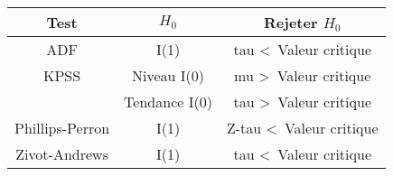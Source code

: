  \begin{f}{\ }

\begin{center}
	\begin{tabular}{ c | c | c }
		Test            & \(H_{0}\)    & Rejeter \(H_{0}\)                     \\ \hline
		ADF             & I(1)       & tau \textless \, Valeur critique    \\ \hline
		KPSS            & Niveau I(0) & mu \textgreater \, Valeur critique  \\
		& Tendance I(0) & tau \textgreater \, Valeur critique \\ \hline
		Phillips-Perron & I(1)       & Z-tau \textless \, Valeur critique  \\ \hline
		Zivot-Andrews   & I(1)       & tau \textless \, Valeur critique
	\end{tabular}
\end{center}
\medskip

\end{f}  

